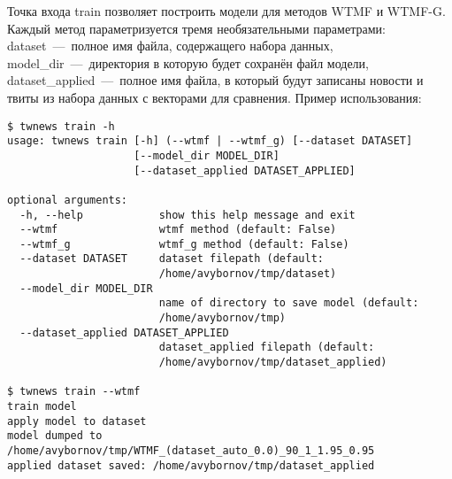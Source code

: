         Точка входа train позволяет построить модели для методов WTMF и WTMF-G. Каждый метод параметризуется тремя необязательными параметрами:
        dataset~---~полное имя файла, содержащего набора данных, model\_dir~---~директория в которую будет сохранён файл модели,
        dataset\_applied~---~полное имя файла, в который будут записаны новости и твиты из набора данных с векторами для сравнения.
        Пример использования:
        \begin{lstlisting}
$ twnews train -h
usage: twnews train [-h] (--wtmf | --wtmf_g) [--dataset DATASET]
                    [--model_dir MODEL_DIR]
                    [--dataset_applied DATASET_APPLIED]

optional arguments:
  -h, --help            show this help message and exit
  --wtmf                wtmf method (default: False)
  --wtmf_g              wtmf_g method (default: False)
  --dataset DATASET     dataset filepath (default:
                        /home/avybornov/tmp/dataset)
  --model_dir MODEL_DIR
                        name of directory to save model (default:
                        /home/avybornov/tmp)
  --dataset_applied DATASET_APPLIED
                        dataset_applied filepath (default:
                        /home/avybornov/tmp/dataset_applied)

$ twnews train --wtmf
train model
apply model to dataset
model dumped to /home/avybornov/tmp/WTMF_(dataset_auto_0.0)_90_1_1.95_0.95
applied dataset saved: /home/avybornov/tmp/dataset_applied


        \end{lstlisting}


